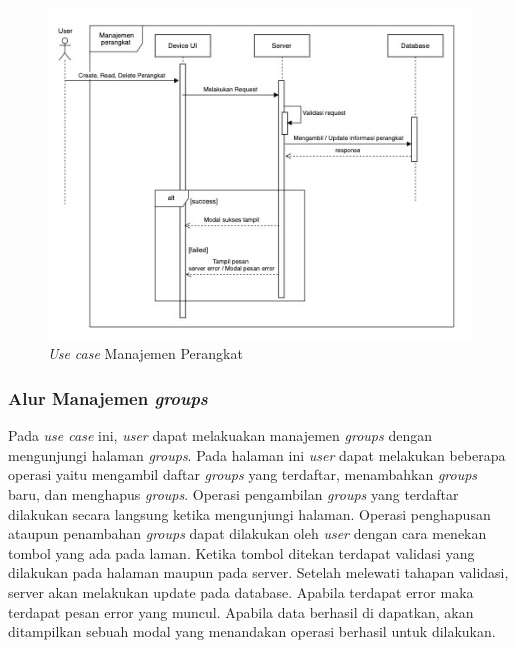\begin{figure}[ht]
  \centering
  \includegraphics[width=1\textwidth]{resources/chapter-3/usecase/uc-08.jpg}
  \caption{\textit{Use case} Manajemen Perangkat}
  \label{fig:usecase-08}
\end{figure}

\pagebreak

\subsubsection{Alur Manajemen \textit{groups}}

Pada \textit{use case} ini, \textit{user} dapat melakuakan manajemen \textit{groups} dengan mengunjungi halaman \textit{groups}. Pada halaman ini \textit{user} dapat melakukan beberapa operasi yaitu mengambil daftar \textit{groups} yang terdaftar, menambahkan \textit{groups} baru, dan menghapus \textit{groups}. Operasi pengambilan \textit{groups} yang terdaftar dilakukan secara langsung ketika mengunjungi halaman. Operasi penghapusan ataupun penambahan \textit{groups} dapat dilakukan oleh \textit{user} dengan cara menekan tombol yang ada pada laman. Ketika tombol ditekan terdapat validasi yang dilakukan pada halaman maupun pada server. Setelah melewati tahapan validasi, server akan melakukan update pada database. Apabila terdapat error maka terdapat pesan error yang muncul. Apabila data berhasil di dapatkan, akan ditampilkan sebuah modal yang menandakan operasi berhasil untuk dilakukan.

